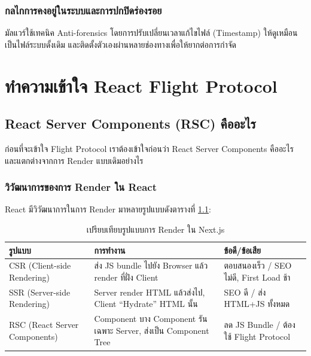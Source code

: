 \documentclass[12pt,oneside]{report}
\begin{document}
\subsection{กลไกการคงอยู่ในระบบและการปกปิดร่องรอย}
มัลแวร์ใช้เทคนิค Anti-forensics โดยการปรับเปลี่ยนเวลาแก้ไขไฟล์ (Timestamp) ให้ดูเหมือนเป็นไฟล์ระบบดั้งเดิม และติดตั้งตัวเองผ่านหลายช่องทางเพื่อให้ยากต่อการกำจัด

\chapter{ทำความเข้าใจ React Flight Protocol}

\section{React Server Components (RSC) คืออะไร}

ก่อนที่จะเข้าใจ Flight Protocol เราต้องเข้าใจก่อนว่า React Server Components คืออะไร และแตกต่างจากการ Render แบบเดิมอย่างไร

\subsection{วิวัฒนาการของการ Render ใน React}

React มีวิวัฒนาการในการ Render มาหลายรูปแบบดังตารางที่ \ref{tab:render_modes}:

\begin{table}[ht]
    \centering
    \caption{เปรียบเทียบรูปแบบการ Render ใน Next.js}
    \vspace{0.3cm}
    \begin{tabular}{p{3cm}p{4.5cm}p{4.5cm}}
        \toprule
        \textbf{รูปแบบ} & \textbf{การทำงาน} & \textbf{ข้อดี/ข้อเสีย} \\
        \midrule
        CSR (Client-side Rendering) & ส่ง JS bundle ไปยัง Browser แล้ว render ที่ฝั่ง Client & ตอบสนองเร็ว / SEO ไม่ดี, First Load ช้า \\
        \midrule
        SSR (Server-side Rendering) & Server render HTML แล้วส่งไป, Client ``Hydrate'' HTML นั้น & SEO ดี / ส่ง HTML+JS ทั้งหมด \\
        \midrule
        RSC (React Server Components) & Component บาง Component รันเฉพาะ Server, ส่งเป็น Component Tree & ลด JS Bundle / ต้องใช้ Flight Protocol \\
        \bottomrule
    \end{tabular}
    \label{tab:render_modes}
\end{table}
\end{document}
